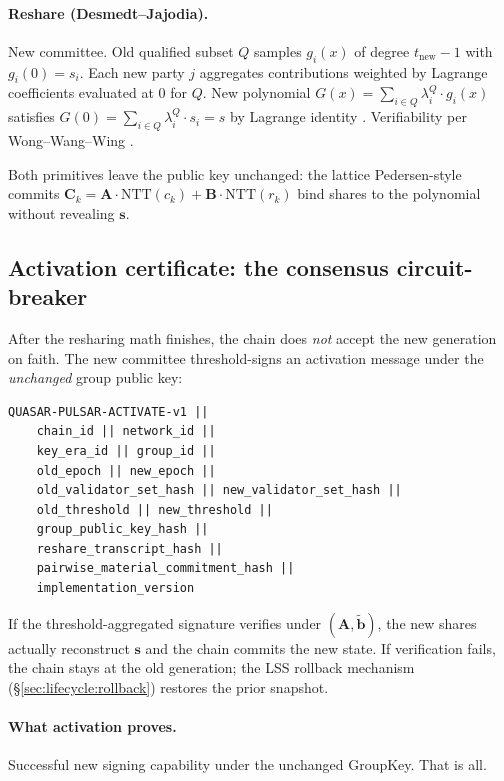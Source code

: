 \paragraph{Reshare (Desmedt--Jajodia).}
New committee. Old qualified subset $Q$ samples $g_i(x)$ of degree
$t_{\text{new}}-1$ with $g_i(0) = s_i$. Each new party $j$ aggregates
contributions weighted by Lagrange coefficients evaluated at $0$ for
$Q$. New polynomial $G(x) = \sum_{i \in Q} \lambda^Q_i \cdot g_i(x)$
satisfies $G(0) = \sum_{i \in Q} \lambda^Q_i \cdot s_i = s$ by Lagrange
identity \cite{desmedtjajodia97}. Verifiability per
Wong--Wang--Wing \cite{wongwangwing02}.

Both primitives leave the public key unchanged: the lattice
Pedersen-style commits $\mathbf{C}_k = \mathbf{A}\cdot\mathrm{NTT}(c_k)
+ \mathbf{B}\cdot\mathrm{NTT}(r_k)$ bind shares to the polynomial
without revealing $\mathbf{s}$.

\subsection{Activation certificate: the consensus circuit-breaker}
\label{sec:lifecycle:activation}

After the resharing math finishes, the chain does \emph{not} accept the
new generation on faith. The new committee threshold-signs an
activation message under the \emph{unchanged} group public key:

\begin{verbatim}
QUASAR-PULSAR-ACTIVATE-v1 ||
    chain_id || network_id ||
    key_era_id || group_id ||
    old_epoch || new_epoch ||
    old_validator_set_hash || new_validator_set_hash ||
    old_threshold || new_threshold ||
    group_public_key_hash ||
    reshare_transcript_hash ||
    pairwise_material_commitment_hash ||
    implementation_version
\end{verbatim}

If the threshold-aggregated signature verifies under
$(\mathbf{A}, \tilde{\mathbf{b}})$, the new shares actually reconstruct
$\mathbf{s}$ and the chain commits the new state. If verification
fails, the chain stays at the old generation; the LSS rollback
mechanism (\S\ref{sec:lifecycle:rollback}) restores the prior
snapshot.

\paragraph{What activation proves.}
Successful new signing capability under the unchanged GroupKey. That
is all.

